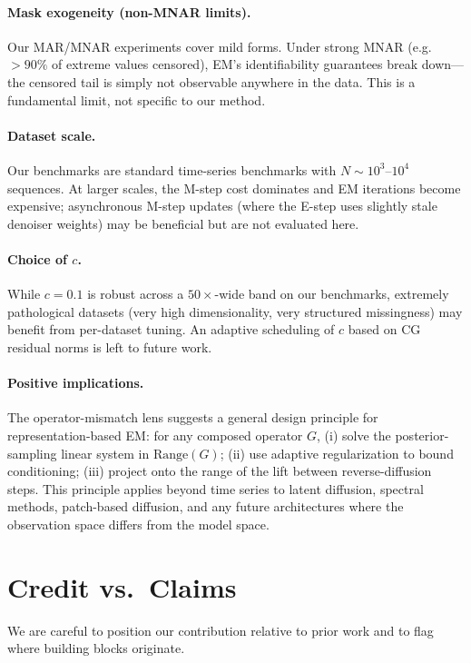 \documentclass{article}
\theoremstyle{plain}
\theoremstyle{definition}
\theoremstyle{remark}
\begin{document}
\paragraph{Mask exogeneity (non-MNAR limits).}
Our MAR/MNAR experiments cover mild forms. Under strong MNAR (e.g.\ $>90\%$ of extreme values censored), EM's identifiability guarantees break down---the censored tail is simply not observable anywhere in the data. This is a fundamental limit, not specific to our method.

\paragraph{Dataset scale.}
Our benchmarks are standard time-series benchmarks with $N \sim 10^3$--$10^4$ sequences. At larger scales, the M-step cost dominates and EM iterations become expensive; asynchronous M-step updates (where the E-step uses slightly stale denoiser weights) may be beneficial but are not evaluated here.

\paragraph{Choice of $c$.}
While $c = 0.1$ is robust across a $50\times$-wide band on our benchmarks, extremely pathological datasets (very high dimensionality, very structured missingness) may benefit from per-dataset tuning. An adaptive scheduling of $c$ based on CG residual norms is left to future work.

\paragraph{Positive implications.}
The operator-mismatch lens suggests a general design principle for representation-based EM: for any composed operator $G$, (i) solve the posterior-sampling linear system in $\mathrm{Range}(G)$; (ii) use adaptive regularization to bound conditioning; (iii) project onto the range of the lift between reverse-diffusion steps. This principle applies beyond time series to latent diffusion, spectral methods, patch-based diffusion, and any future architectures where the observation space differs from the model space.

\section{Credit vs.\ Claims}
\label{app:credit}

We are careful to position our contribution relative to prior work and to flag where building blocks originate.
\end{document}
